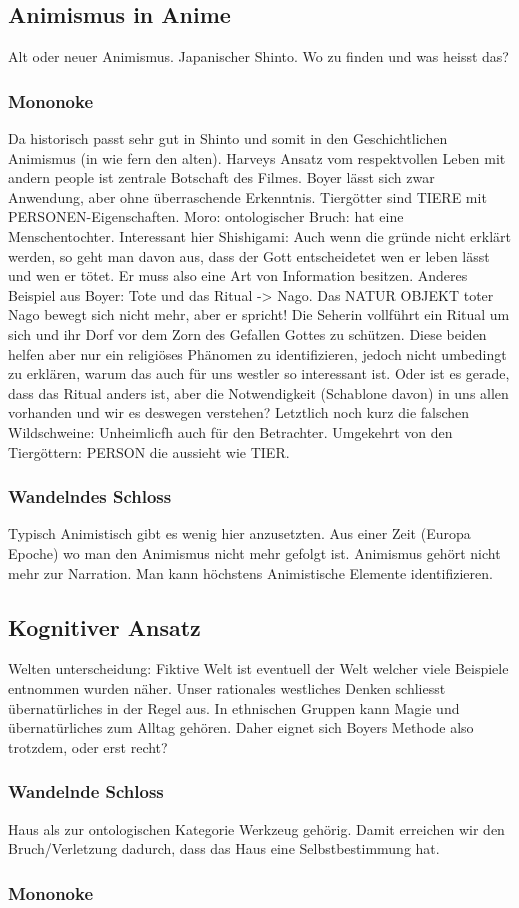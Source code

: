 \subsection{Animismus in Anime}
Alt oder neuer Animismus. Japanischer Shinto. Wo zu finden und was heisst das?

\subsubsection*{Mononoke}
Da historisch passt sehr gut in Shinto und somit in den Geschichtlichen Animismus (in wie fern den alten). Harveys Ansatz vom respektvollen Leben mit andern people ist zentrale Botschaft des Filmes. Boyer lässt sich zwar Anwendung, aber ohne überraschende Erkenntnis. Tiergötter sind TIERE mit PERSONEN-Eigenschaften. Moro: ontologischer Bruch: hat eine Menschentochter. Interessant hier Shishigami: Auch wenn die gründe nicht erklärt werden, so geht man davon aus, dass der Gott entscheidetet wen er leben lässt und wen er tötet. Er muss also eine Art von Information besitzen. Anderes Beispiel aus Boyer: Tote und das Ritual -> Nago. Das NATUR OBJEKT toter Nago bewegt sich nicht mehr, aber er spricht! Die Seherin vollführt ein Ritual um sich und ihr Dorf vor dem Zorn des Gefallen Gottes zu schützen. Diese beiden helfen aber nur ein religiöses Phänomen zu identifizieren, jedoch nicht umbedingt zu erklären, warum das auch für uns westler so interessant ist. Oder ist es gerade, dass das Ritual anders ist, aber die Notwendigkeit (Schablone davon) in uns allen vorhanden und wir es deswegen verstehen? Letztlich noch kurz die falschen Wildschweine: Unheimlicfh auch für den Betrachter. Umgekehrt von den Tiergöttern: PERSON die aussieht wie TIER.

\subsubsection*{Wandelndes Schloss}
Typisch Animistisch gibt es wenig hier anzusetzten. Aus einer Zeit (Europa Epoche) wo man den Animismus nicht mehr gefolgt ist. Animismus gehört nicht mehr zur Narration. Man kann höchstens Animistische Elemente identifizieren. 


\subsection{Kognitiver Ansatz}
Welten unterscheidung: Fiktive Welt ist eventuell der Welt welcher viele Beispiele entnommen wurden näher. Unser rationales westliches Denken schliesst übernatürliches in der Regel aus. In ethnischen Gruppen kann Magie und übernatürliches zum Alltag gehören. Daher eignet sich Boyers Methode also trotzdem, oder erst recht?

\subsubsection*{Wandelnde Schloss}
Haus als zur ontologischen Kategorie Werkzeug gehörig. Damit erreichen wir den Bruch/Verletzung dadurch, dass das Haus eine Selbstbestimmung hat.

\subsubsection*{Mononoke} 